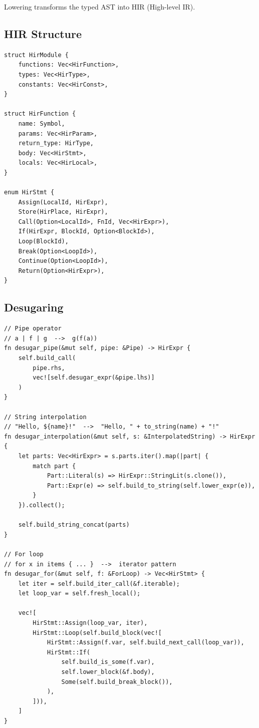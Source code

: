 Lowering transforms the typed AST into HIR (High-level IR).

\subsection{HIR Structure}

\begin{lstlisting}[language={}]
struct HirModule {
    functions: Vec<HirFunction>,
    types: Vec<HirType>,
    constants: Vec<HirConst>,
}

struct HirFunction {
    name: Symbol,
    params: Vec<HirParam>,
    return_type: HirType,
    body: Vec<HirStmt>,
    locals: Vec<HirLocal>,
}

enum HirStmt {
    Assign(LocalId, HirExpr),
    Store(HirPlace, HirExpr),
    Call(Option<LocalId>, FnId, Vec<HirExpr>),
    If(HirExpr, BlockId, Option<BlockId>),
    Loop(BlockId),
    Break(Option<LoopId>),
    Continue(Option<LoopId>),
    Return(Option<HirExpr>),
}
\end{lstlisting}

\subsection{Desugaring}

\begin{lstlisting}[language={}]
// Pipe operator
// a | f | g  -->  g(f(a))
fn desugar_pipe(&mut self, pipe: &Pipe) -> HirExpr {
    self.build_call(
        pipe.rhs,
        vec![self.desugar_expr(&pipe.lhs)]
    )
}

// String interpolation
// "Hello, ${name}!"  -->  "Hello, " + to_string(name) + "!"
fn desugar_interpolation(&mut self, s: &InterpolatedString) -> HirExpr {
    let parts: Vec<HirExpr> = s.parts.iter().map(|part| {
        match part {
            Part::Literal(s) => HirExpr::StringLit(s.clone()),
            Part::Expr(e) => self.build_to_string(self.lower_expr(e)),
        }
    }).collect();

    self.build_string_concat(parts)
}

// For loop
// for x in items { ... }  -->  iterator pattern
fn desugar_for(&mut self, f: &ForLoop) -> Vec<HirStmt> {
    let iter = self.build_iter_call(&f.iterable);
    let loop_var = self.fresh_local();

    vec![
        HirStmt::Assign(loop_var, iter),
        HirStmt::Loop(self.build_block(vec![
            HirStmt::Assign(f.var, self.build_next_call(loop_var)),
            HirStmt::If(
                self.build_is_some(f.var),
                self.lower_block(&f.body),
                Some(self.build_break_block()),
            ),
        ])),
    ]
}
\end{lstlisting}

